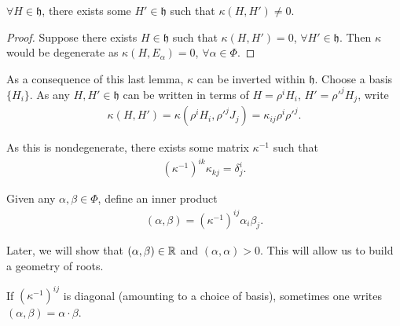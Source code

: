 \begin{lemma}
    $\forall H \in \mathfrak{h}$, there exists some $H' \in \mathfrak{h}$ such that $\kappa \left( H,H' \right) \neq 0$.
\end{lemma}
\begin{proof}
    Suppose there exists $H \in \mathfrak{h}$ such that $\kappa \left( H, H' \right) = 0$, $\forall H' \in \mathfrak{h}$. Then $\kappa$ would be degenerate as $\kappa \left( H, E_\alpha \right) =0$, $\forall \alpha \in \Phi$.
\end{proof}

As a consequence of this last lemma, $\kappa$ can be inverted within $\mathfrak{h}$. Choose a basis $\{H_{i}\}$. As any $H, H' \in \mathfrak{h}$ can be written in terms of $H = \rho^{i} H_i$, $H' = \rho'^{j} H_j$, write
\begin{align}
    \kappa \left( H, H' \right) = \kappa \left( \rho^{i} H_i, \rho'^{j}J_j \right) = \kappa_{ij} \rho^{i} \rho'^{j}
.\end{align}

As this is nondegenerate, there exists some matrix $\kappa^{-1}$ such that
\begin{align}
    \left( \kappa^{-1} \right)^{ik} \kappa_{kj} = \delta^{i}_j
.\end{align}

Given any $\alpha, \beta \in \Phi$, define an inner product
\begin{align}
    \left( \alpha, \beta \right) = \left( \kappa^{-1} \right)^{ij} \alpha_i \beta_j
.\end{align}

Later, we will show that $\left( \alpha, \beta \right) \in \mathbb{R}$ and $\left( \alpha,\alpha \right) > 0$. This will allow us to build a geometry of roots.

\begin{note}
    If $\left( \kappa^{-1} \right)^{ij}$ is diagonal (amounting to a choice of basis), sometimes one writes $\left( \alpha, \beta \right) = \alpha \cdot \beta$.
\end{note}
